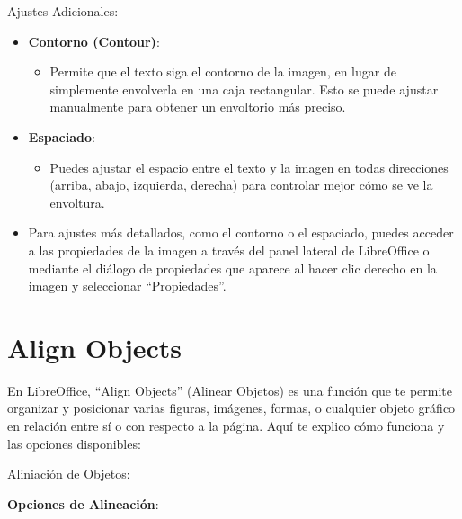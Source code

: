 \documentclass[
  jou,
  floatsintext,
  longtable,
  a4paper,
  nolmodern,
  notxfonts,
  notimes,
  12pt,
  colorlinks=true,linkcolor=blue,citecolor=blue,urlcolor=blue]{apa7}
\providecommand{\tightlist}{%
  \setlength{\itemsep}{0pt}\setlength{\parskip}{0pt}}
\begin{document}
Ajustes Adicionales:

\begin{itemize}
\item
  \textbf{Contorno (Contour)}:

  \begin{itemize}
  \tightlist
  \item
    Permite que el texto siga el contorno de la imagen, en lugar de
    simplemente envolverla en una caja rectangular. Esto se puede
    ajustar manualmente para obtener un envoltorio más preciso.
  \end{itemize}
\item
  \textbf{Espaciado}:

  \begin{itemize}
  \tightlist
  \item
    Puedes ajustar el espacio entre el texto y la imagen en todas
    direcciones (arriba, abajo, izquierda, derecha) para controlar mejor
    cómo se ve la envoltura.
  \end{itemize}
\item
  Para ajustes más detallados, como el contorno o el espaciado, puedes
  acceder a las propiedades de la imagen a través del panel lateral de
  LibreOffice o mediante el diálogo de propiedades que aparece al hacer
  clic derecho en la imagen y seleccionar ``Propiedades''.
\end{itemize}

\section{Align Objects}\label{align-objects}

En LibreOffice, ``Align Objects'' (Alinear Objetos) es una función que
te permite organizar y posicionar varias figuras, imágenes, formas, o
cualquier objeto gráfico en relación entre sí o con respecto a la
página. Aquí te explico cómo funciona y las opciones disponibles:

Aliniación de Objetos:

\textbf{Opciones de Alineación}:
\end{document}
